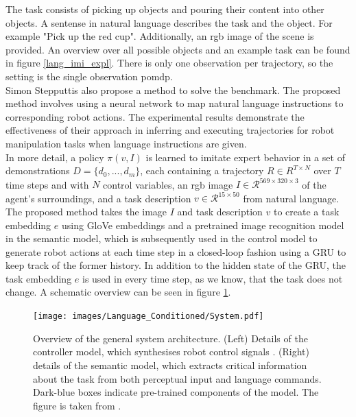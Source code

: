The task consists of picking up objects and pouring their content into other objects. A sentense in natural language describes the task and the object. 
For example "Pick up the red cup". Additionally, an rgb image of the scene is provided. An overview over 
all possible objects and an example task can be found in figure \ref{lang_imi_expl}. 
There is only one observation per trajectory, so the setting is the single observation \ac{pomdp}.  \\


Simon Stepputtis \etAl \cite{stepputtis2020languageconditioned} also propose a method to solve the benchmark. 
The proposed method involves using a neural network to map natural language instructions to 
corresponding robot actions. The experimental results demonstrate the effectiveness of their approach in inferring and executing trajectories for robot manipulation 
tasks when language instructions are given. \\

In more detail, a policy $\pi(v,I)$ is learned to imitate expert behavior in a set of demonstrations $D = \{d_0,...,d_m\}$, each containing a trajectory 
$R \in R^{T \times N}$ over $T$ time steps and with $N$ control variables, an rgb image $I \in \mathcal{R}^{569 \times 320 \times 3}$ of the agent's surroundings, 
and a task description $v \in \mathcal{R}^{15 \times 50}$ from natural language. The proposed method takes the image $I$ and task description $v$ 
to create a task embedding $e$ using GloVe embeddings and a pretrained image recognition model in the semantic model, 
which is subsequently used in the control model to generate robot actions at each time step in a closed-loop 
fashion using a GRU to keep track of the former history. In addition to the hidden state of the GRU, 
the task embedding $e$ is used in every time step, as we know, that the task does not change. A schematic overview can be seen in figure \ref{language_imitation}. \\

\begin{figure}[htbp]
    \centering
    \texttt{[image: images/Language\_Conditioned/System.pdf]}
    \caption{Overview of the general system architecture. (Left) Details of the controller model, which
    synthesises robot control signals . (Right) details of the semantic model, which extracts critical
    information about the task from both perceptual input and language commands. Dark-blue boxes
    indicate pre-trained components of the model. The figure is taken from \cite{stepputtis2020languageconditioned}.}
    \label{language_imitation}
\end{figure}

